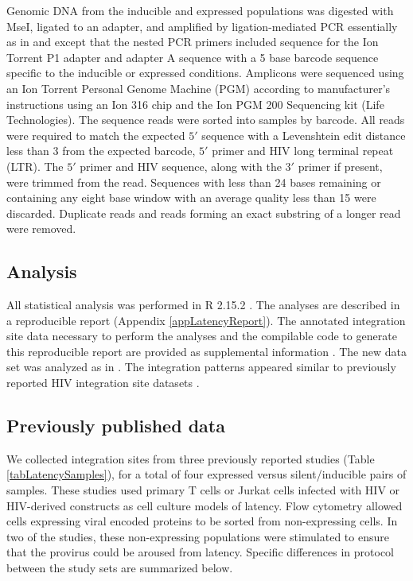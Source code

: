 \documentclass[../sherrill-Mix_thesis.tex]{subfiles}
\begin{document}
		Genomic DNA from the inducible and expressed populations was digested with MseI, ligated to an adapter, and amplified by ligation-mediated PCR essentially as in \citet{Wu2003} and \citet{Mitchell2004}  except that the nested PCR primers included sequence for the Ion Torrent P1 adapter and adapter A sequence with a 5 base barcode sequence specific to the inducible or expressed conditions. Amplicons were sequenced using an Ion Torrent Personal Genome Machine (PGM) according to manufacturer's instructions using an Ion 316 chip and the Ion PGM 200 Sequencing kit (Life Technologies). The sequence reads were sorted into samples by barcode. All reads were required to match the expected $5'$ sequence with a Levenshtein edit distance less than 3 from the expected barcode, $5'$ primer and HIV long terminal repeat (LTR). The $5'$ primer and HIV sequence, along with the $3'$ primer if present, were trimmed from the read. Sequences with less than 24 bases remaining or containing any eight base window with an average quality less than 15 were discarded. Duplicate reads and reads forming an exact substring of a longer read were removed. 

	\subsection{Analysis}
		All statistical analysis was performed in R 2.15.2 \citep{RCoreTeam2012}. The analyses are described in a reproducible report (Appendix \ref{appLatencyReport}). The annotated integration site data necessary to perform the analyses and the compilable code to generate this reproducible report are provided as supplemental information \citep{Sherrill-Mix2013}. The new \Memory{} data set was analyzed as in \citet{Berry2006}.  The integration patterns appeared similar to previously reported HIV integration site datasets \citep{Wang2007a}.

	\subsection{Previously published data}
		We collected integration sites from three previously reported studies (Table \ref{tabLatencySamples}), for a total of four expressed versus silent/inducible pairs of samples. These studies used primary \cdFour{} T cells or Jurkat cells infected with HIV or HIV-derived constructs as cell culture models of latency. Flow cytometry allowed cells expressing viral encoded proteins to be sorted from non-expressing cells. In two of the studies, these non-expressing populations were stimulated to ensure that the provirus could be aroused from latency. Specific differences in protocol between the study sets are summarized below. 
\end{document}
